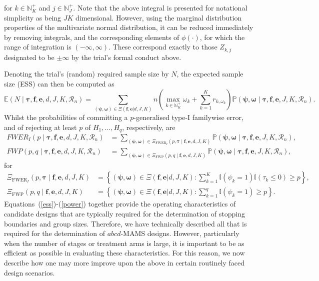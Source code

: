 \documentclass{article}
\numberwithin{equation}{section}
\theoremstyle{plain}
\begin{document}
for $k\in\mathbb{N}_K^+$ and $j\in\mathbb{N}_J^+$. Note that the above integral is presented for notational simplicity as being $JK$ dimensional. However, using the marginal distribution properties of the multivariate normal distribution, it can be reduced immediately by removing integrals, and the corresponding elements of $\phi(\cdot)$, for which the range of integration is $(-\infty,\infty)$. These correspond exactly to those $Z_{k,j}$ designated to be $\pm\infty$ by the trial's formal conduct above.

Denoting the trial's (random) required sample size by $N$, the expected sample size (ESS) can then be computed as
\begin{equation}
\mathbb{E}(N\mid\boldsymbol{\tau},\boldsymbol{f},\boldsymbol{e},d,J,K,\mathscr{R}_n) = \sum_{(\boldsymbol{\psi},\boldsymbol{\omega}) \in \Xi(\boldsymbol{f},\boldsymbol{e}|d,J,K)} n\left( \max_{k\in\mathbb{N}_K^+}\omega_k + \sum_{k=1}^Kr_{k,\omega_k}\right)\mathbb{P}(\boldsymbol{\psi},\boldsymbol{\omega}\mid\boldsymbol{\tau},\boldsymbol{f},\boldsymbol{e},J,K,\mathscr{R}_n).\label{ess}
\end{equation}
Whilst the probabilities of committing a $p$-generalised type-I familywise error, and of rejecting at least $p$ of $H_1,\dots,H_q$, respectively, are
\begin{align}
FWER_I(p\mid \boldsymbol{\tau},\boldsymbol{f},\boldsymbol{e},d,J,K,\mathscr{R}_n)&= \sum_{(\boldsymbol{\psi},\boldsymbol{\omega}) \in \Xi_{\text{FWER}_I}(p,\boldsymbol{\tau}\mid \boldsymbol{f},\boldsymbol{e},d,J,K)} \mathbb{P}(\boldsymbol{\psi},\boldsymbol{\omega}\mid\boldsymbol{\tau},\boldsymbol{f},\boldsymbol{e},J,K,\mathscr{R}_n),\label{fwer}\\
FWP(p,q\mid \boldsymbol{\tau},\boldsymbol{f},\boldsymbol{e},d,J,K,\mathscr{R}_n)&= \sum_{(\boldsymbol{\psi},\boldsymbol{\omega}) \in \Xi_{\text{FWP}}(p,q\mid \boldsymbol{f},\boldsymbol{e},d,J,K)} \mathbb{P}(\boldsymbol{\psi},\boldsymbol{\omega}\mid\boldsymbol{\tau},\boldsymbol{f},\boldsymbol{e},J,K,\mathscr{R}_n),\label{power}
\end{align}
for
\begin{align*}
\Xi_{\text{FWER}_I}(p,\boldsymbol{\tau}\mid \boldsymbol{f},\boldsymbol{e},d,J,K) &= \left\{(\boldsymbol{\psi},\boldsymbol{\omega}) \in \Xi(\boldsymbol{f},\boldsymbol{e}|d,J,K) : \sum_{k=1}^{K}\mathbb{I}(\psi_k = 1)\mathbb{I}(\tau_k \le 0) \ge p\right\},\\
\Xi_{\text{FWP}}(p,q\mid \boldsymbol{f},\boldsymbol{e},d,J,K) &= \left\{(\boldsymbol{\psi},\boldsymbol{\omega}) \in \Xi(\boldsymbol{f},\boldsymbol{e}|d,J,K) : \sum_{k=1}^{q}\mathbb{I}(\psi_k = 1) \ge p\right\}.
\end{align*}
Equations~(\ref{ess})-(\ref{power}) together provide the operating characteristics of candidate designs that are typically required for the determination of stopping boundaries and group sizes. Therefore, we have technically described all that is required for the determination of $abcd$-MAMS designs. However, particularly when the number of stages or treatment arms is large, it is important to be as efficient as possible in evaluating these characteristics. For this reason, we now describe how one may more improve upon the above in certain routinely faced design scenarios. 
\end{document}
